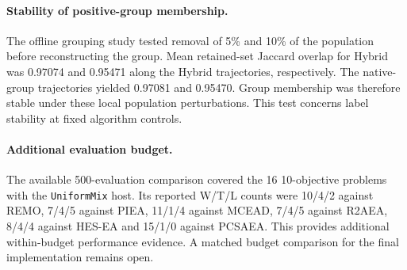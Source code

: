 \paragraph{Stability of positive-group membership.}
The offline grouping study tested removal of 5\% and 10\% of the
population before reconstructing the group. Mean retained-set Jaccard
overlap for Hybrid was 0.97074 and 0.95471 along the Hybrid trajectories,
respectively. The native-group trajectories yielded 0.97081 and
0.95470. Group membership was therefore stable under these local
population perturbations. This test concerns label stability at fixed
algorithm controls.

\paragraph{Additional evaluation budget.}
The available 500-evaluation comparison covered the 16 10-objective
problems with the \texttt{UniformMix} host. Its reported W/T/L counts
were 10/4/2 against REMO, 7/4/5 against PIEA, 11/1/4 against MCEAD,
7/4/5 against R2AEA, 8/4/4 against HES-EA and 15/1/0 against PCSAEA.
This provides additional within-budget performance evidence. A
matched budget comparison for the final implementation remains open.


\clearpage
